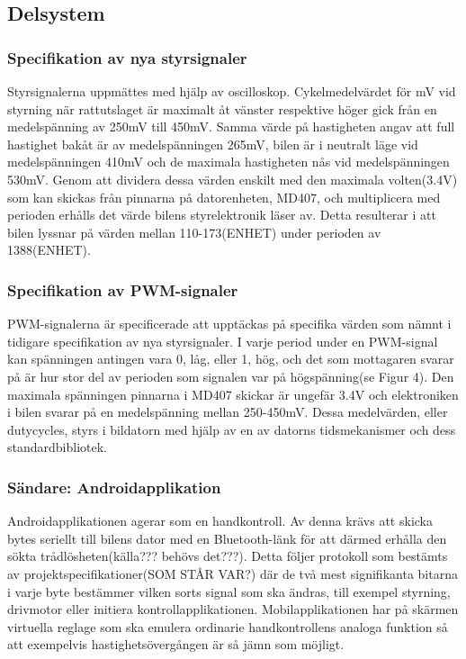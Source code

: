 \documentclass[a4paper]{article}
\begin{document}
\subsection{Delsystem}
\subsubsection{Specifikation av nya styrsignaler}
Styrsignalerna uppmättes med hjälp av oscilloskop. Cykelmedelvärdet för mV vid styrning när rattutslaget är maximalt åt vänster respektive höger gick från en medelspänning av 250mV till 450mV. Samma värde på hastigheten angav att full hastighet bakåt är av medelspänningen 265mV, bilen är i neutralt läge vid medelspänningen 410mV och de maximala hastigheten nås vid medelspänningen 530mV. Genom att dividera dessa värden enskilt med den maximala volten(3.4V) som kan skickas från pinnarna på datorenheten, MD407, och multiplicera med perioden erhålls det värde bilens styrelektronik läser av. Detta resulterar i att bilen lyssnar på värden mellan 110-173(ENHET) under perioden av 1388(ENHET).

\subsubsection{Specifikation av PWM-signaler}
PWM-signalerna är specificerade att upptäckas på specifika värden som nämnt i tidigare specifikation av nya styrsignaler. I varje period under en PWM-signal kan spänningen antingen vara 0, låg, eller 1, hög, och det som mottagaren svarar på är hur stor del av perioden som signalen var på högspänning(se Figur 4). Den maximala spänningen pinnarna i MD407 skickar är ungefär 3.4V och elektroniken i bilen svarar på en medelspänning mellan 250-450mV. Dessa medelvärden, eller dutycycles, styrs i bildatorn med hjälp av en av datorns tidsmekanismer och dess standardbibliotek.

\subsubsection{Sändare: Androidapplikation}
Androidapplikationen agerar som en handkontroll. Av denna krävs att skicka bytes seriellt till bilens dator med en Bluetooth-länk för att därmed erhålla den sökta trådlösheten(källa??? behövs det???). Detta följer protokoll som bestämts av projektspecifikationer(SOM STÅR VAR?) där de två mest signifikanta bitarna i varje byte bestämmer vilken sorts signal som ska ändras, till exempel styrning, drivmotor eller initiera kontrollapplikationen. Mobilapplikationen har på skärmen virtuella reglage som ska emulera ordinarie handkontrollens analoga funktion så att exempelvis hastighetsövergången är så jämn som möjligt.
\end{document}
